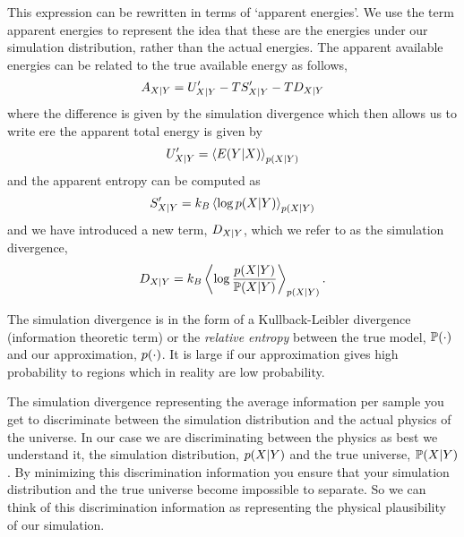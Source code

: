 \documentclass[]{article}
\begin{document}
This expression can be rewritten in terms of `apparent energies'. We use the term apparent energies to represent the idea that these are the energies under our simulation distribution, rather than the actual energies. The apparent available energies can be related to the true available energy as follows, 
\[
A_{X|Y} = U^\prime_{X|Y} - TS^\prime_{X|Y} - TD_{X|Y}
\] 
where the difference is given by the simulation divergence
which then allows us to write ere the apparent total energy is given by 
\[
U^\prime_{X|Y} = \left\langle E(Y|X) \right\rangle_{p(X|Y) } 
\] and the apparent entropy can be computed as \[
S^\prime_{X|Y}=k_B\left\langle \log p(X|Y)  \right\rangle_{p(X|Y) }
\] and we have introduced a new term,
\(D_{X|Y}\), which we refer to as the simulation
divergence, 
\[
D_{X|Y} = k_B \left\langle \log \frac{p(X| Y)}{\mathbb{P}(X|Y) } \right\rangle_{p(X|Y) }.
\]

The simulation divergence is in the form of a Kullback-Leibler
divergence (information theoretic term) or the \emph{relative entropy}
between the true model, \(\mathbb{P}(\cdot)\) and our approximation,
\(p(\cdot)\). It is large if our approximation gives high
probability to regions which in reality are low probability.

The simulation divergence representing the average information per sample you get to discriminate between the simulation distribution and the actual physics of the universe. In our case we are discriminating between the physics as best we understand it, the simulation distribution, $p(X|Y)$ and the true universe, $\mathbb{P}(X | Y)$. By minimizing this discrimination information you ensure that your simulation distribution and the true universe become impossible to separate. So we can think of this discrimination information as representing the physical plausibility of our simulation. 
\end{document}
